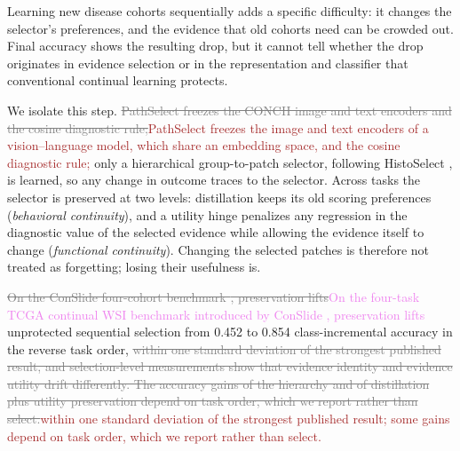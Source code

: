 \documentclass{article}
\newif\ifmarkup \markuptrue
\newcommand{\repc}[3]{\ifmarkup\textcolor{gray}{\sout{#2}}\textcolor{#1}{#3}\else#3\fi}
\newcommand{\repP}[2]{\repc{violet}{#1}{#2}}  %
\newcommand{\repB}[2]{\repc{brown}{#1}{#2}}   %
\begin{document}
Learning new disease cohorts sequentially adds a specific difficulty: it changes the selector's preferences, and the evidence that old cohorts need can be crowded out. Final accuracy shows the resulting drop, but it cannot tell whether the drop originates in evidence selection or in the representation and classifier that conventional continual learning protects.

We isolate this step. \repB{PathSelect freezes the CONCH image and text encoders \cite{lu2024conch} and the cosine diagnostic rule;}{PathSelect freezes the image and text encoders of a vision--language model, which share an embedding space, and the cosine diagnostic rule;} only a hierarchical group-to-patch selector, following HistoSelect \cite{huang2026histoselect}, is learned, so any change in outcome traces to the selector. Across tasks the selector is preserved at two levels: distillation keeps its old scoring preferences (\emph{behavioral continuity}), and a utility hinge penalizes any regression in the diagnostic value of the selected evidence while allowing the evidence itself to change (\emph{functional continuity}). Changing the selected patches is therefore not treated as forgetting; losing their usefulness is.

\repP{On the ConSlide four-cohort benchmark \cite{huang2023conslide}, preservation lifts}{On the four-task TCGA continual WSI benchmark introduced by ConSlide \cite{huang2023conslide}, preservation lifts} unprotected sequential selection from 0.452 to 0.854 class-incremental accuracy in the reverse task order, \repB{within one standard deviation of the strongest published result, and selection-level measurements show that evidence identity and evidence utility drift differently. The accuracy gains of the hierarchy and of distillation plus utility preservation depend on task order, which we report rather than select.}{within one standard deviation of the strongest published result; some gains depend on task order, which we report rather than select.}
\end{document}
